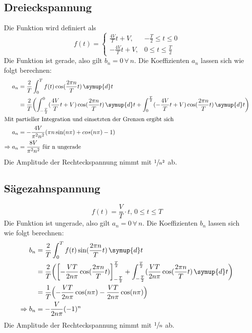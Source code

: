 \subsection{Dreieckspannung}
Die Funktion wird definiert als
\begin{equation*}
    f(t) =
    \begin{cases}
        \frac{4V}{T}t + V, & -\frac{T}{2} \leq t \leq 0 \\
        -\frac{4V}{T}t + V, & 0 \leq t \leq \frac{T}{2}
    \end{cases}
\end{equation*}
Die Funktion ist gerade, also gilt $b_n = 0  \, \forall \, n$.
Die Koeffizienten $a_n$ lassen sich wie folgt berechnen:
\begin{align*}
    a_n &= \frac{2}{T} \int_0^T f(t) \cos(\frac{2 \pi n}{T}t) \, \symup{d}t \\
        &= \frac{2}{T} \biggl( \int_{-\frac{T}{2}}^0 (\frac{4V}{T}t + V) \cos(\frac{2 \pi n}{T}t) \, \symup{d}t
                            + \int_{0}^{\frac{T}{2}} (-\frac{4V}{T}t + V) \cos(\frac{2 \pi n}{T}t) \, \symup{d}t \biggr) \\
    \intertext{Mit partieller Integration und einsetzten der Grenzen ergibt sich}
    a_n &= -\frac{4V}{\pi^2 n^2} (\pi n \sin(n \pi)+ cos(n \pi) - 1)\\
    \Rightarrow a_n &= \frac{8V}{\pi^2 n^2} \text{ für n ungerade}
\end{align*}
Die Amplitude der Rechteckspannung nimmt mit $\sfrac{1}{n^2}$ ab.
\subsection{Sägezahnspannung}
\begin{equation*}
    f(t) = \frac{V}{T} \cdot t, \, 0 \leq t \leq T
\end{equation*}
Die Funktion ist ungerade, also gilt $a_n = 0  \, \forall \, n$.
Die Koeffizienten $b_n$ lassen sich wie folgt berechnen:
\begin{align*}
    b_n &= \frac{2}{T} \int_0^T f(t) \sin(\frac{2 \pi n}{T}t) \, \symup{d}t \\
        &= \frac{2}{T} \biggl(\left[-\frac{VT}{2n\pi} \cos(\frac{2 \pi n}{T}t) \right]_{-\frac{T}{2}}^{\frac{T}{2}}
                    + \int_{-\frac{T}{2}}^{\frac{T}{2}} (\frac{VT}{2n\pi} \cos(\frac{2 \pi n}{T}t) \, \symup{d}t \biggr) \\
        &= \frac{1}{T} \Bigl( - \frac{VT}{2n\pi} \cos(n \pi) - \frac{VT}{2n\pi}\cos(n\pi)\Bigr) \\
    \Rightarrow b_n &= -\frac{V}{2n\pi} (-1)^n
\end{align*}
Die Amplitude der Rechteckspannung nimmt mit $\sfrac{1}{n}$ ab.